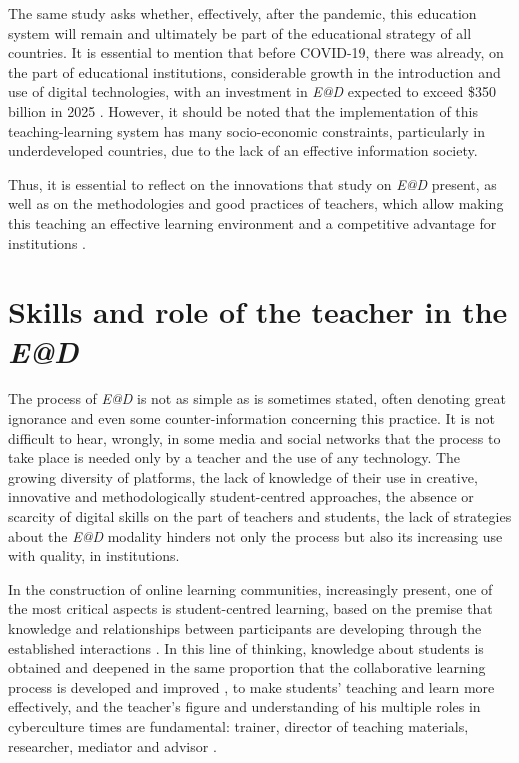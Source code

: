 \documentclass[english]{textolivre}
\begin{document}
The same study asks whether, effectively, after the pandemic, this education system will remain and ultimately be part of the educational strategy of all countries. It is essential to mention that before COVID-19, there was already, on the part of educational institutions, considerable growth in the introduction and use of digital technologies, with an investment in \emph{E@D} expected to exceed \$350 billion in 2025 \cite{li2020}. However, it should be noted that the implementation of this teaching-learning system has many socio-economic constraints, particularly in underdeveloped countries, due to the lack of an effective information society.

Thus, it is essential to reflect on the innovations that study on \emph{E@D} present, as well as on the methodologies and good practices of teachers, which allow making this teaching an effective learning environment and a competitive advantage for institutions \cite{mcgill2014, ilin2017}.

\section{Skills and role of the teacher in the \emph{E@D}}
The process of \emph{E@D} is not as simple as is sometimes stated, often denoting great ignorance and even some counter-information concerning this practice. It is not difficult to hear, wrongly, in some media and social networks that the process to take place is needed only by a teacher and the use of any technology. The growing diversity of platforms, the lack of knowledge of their use in creative, innovative and methodologically student-centred approaches, the absence or scarcity of digital skills on the part of teachers and students, the lack of strategies about the \emph{E@D} modality hinders not only the process but also its increasing use with quality, in institutions.

In the construction of online learning communities, increasingly present, one of the most critical aspects is student-centred learning, based on the premise that knowledge and relationships between participants are developing through the established interactions \cite{martinho2014}. In this line of thinking, knowledge about students is obtained and deepened in the same proportion that the collaborative learning process is developed and improved \cite{anderson2008, garrison2008, palloff2007}, to make students' teaching and learn more effectively, and the teacher's figure and understanding of his multiple roles in cyberculture times are fundamental: trainer, director of teaching materials, researcher, mediator and advisor \cite{bruno2010}.
\end{document}
